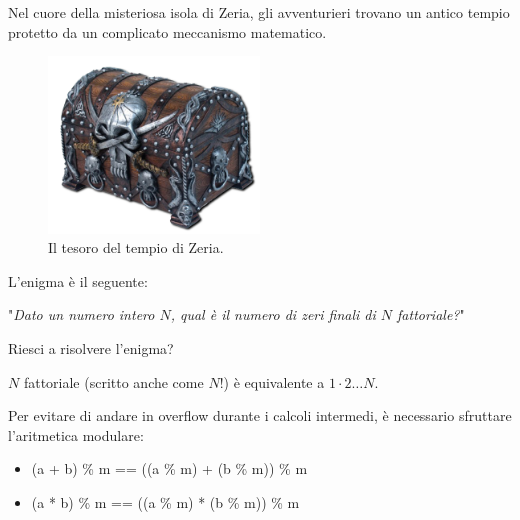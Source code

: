 \usepackage{xcolor}
\usepackage{afterpage}
\usepackage{pifont,mdframed}
\usepackage[bottom]{footmisc}
\usepackage{minted}


\newcommand{\inputfile}{\texttt{stdin}}
\newcommand{\outputfile}{\texttt{stdout}}
\makeatletter
\renewcommand{\this@inputfilename}{\texttt{stdin}}
\renewcommand{\this@outputfilename}{\texttt{stdout}}
\makeatother


Nel cuore della misteriosa isola di Zeria, gli avventurieri trovano un antico tempio protetto da un complicato
meccanismo matematico.

\begin{figure}[h]
    \centering
    \includegraphics[width=0.5\textwidth]{chest.png}
    \caption{Il tesoro del tempio di Zeria.}
\end{figure}

L'enigma è il seguente:

"\textit{Dato un numero intero $N$, qual è il numero di zeri finali di $N$ fattoriale?}"

Riesci a risolvere l'enigma?
\begin{warning}
    $N$ fattoriale (scritto anche come $N!$) è equivalente a $1 \cdot 2 \dots N$.

    Per evitare di andare in overflow durante i calcoli intermedi, è necessario sfruttare l'aritmetica
    modulare:
    \begin{itemize}
        \item (a + b) \% m == ((a \% m) + (b \% m)) \% m
        \item (a * b) \% m == ((a \% m) * (b \% m)) \% m
    \end{itemize}
\end{warning}




